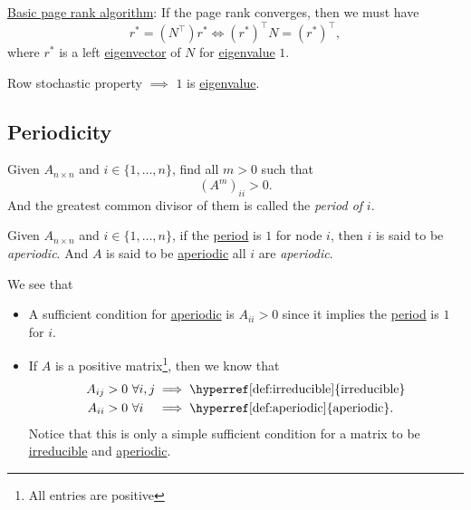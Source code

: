 \begin{prev}
	\hyperref[algo:basic-page-rank-algorithm]{Basic page rank algorithm}: If the page rank converges,
	then we must have
	\[
		r^{\ast} = (N^{\top})r^{\ast} \iff (r^{\ast})^{\top} N = (r^{\ast})^{\top},
	\]
	where \(r^{\ast}\) is a left \hyperref[def:eigenvector]{eigenvector} of \(N\) for \hyperref[def:eigenvalue]{eigenvalue} \(1\).
\end{prev}
\begin{remark}
	Row stochastic property \(\implies\) \(1\) is \hyperref[def:eigenvalue]{eigenvalue}.
\end{remark}

\subsection{Periodicity}
\begin{definition}[Period]\label{def:period}
	Given \(A_{n\times n}\) and \(i\in\{1, \ldots , n\}\), find all \(m>0\) such that
	\[
		(A^m)_{ii}>0.
	\]
	And the greatest common divisor of them is called the \emph{period of} \(i\).
\end{definition}

\begin{definition}[Aperiodic]\label{def:aperiodic}
	Given \(A_{n\times n}\) and \(i\in\{1, \ldots , n\}\), if the \hyperref[def:period]{period} is \(1\) for node \(i\), then \(i\)
	is said to be \emph{aperiodic}. And \(A\) is said to be \hyperref[def:aperiodic]{aperiodic} all \(i\) are \emph{aperiodic}.
\end{definition}

\begin{remark}\label{rmk:lec11-1}
	We see that
	\begin{itemize}
		\item A sufficient condition for \hyperref[def:aperiodic]{aperiodic} is \(A_{ii} > 0 \) since it implies the \hyperref[def:period]{period} is \(1\) for \(i\).
		\item If \(A\) is a positive matrix\footnote{All entries are positive}, then we know that
		      \[
			      \begin{alignedat}{3}
				      A_{ij}>0\ &\forall i, j &&\implies \text{\hyperref[def:irreducible]{irreducible}}\\
				      A_{ii}>0\ &\forall i &&\implies \text{\hyperref[def:aperiodic]{aperiodic}}.
			      \end{alignedat}
		      \]
		      Notice that this is only a simple sufficient condition for a matrix to be \hyperref[def:irreducible]{irreducible} and \hyperref[def:aperiodic]{aperiodic}.
	\end{itemize}
\end{remark}

